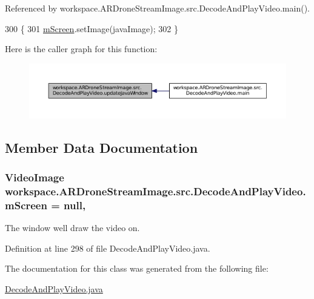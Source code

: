 Referenced by workspace.\+A\+R\+Drone\+Stream\+Image.\+src.\+Decode\+And\+Play\+Video.\+main().


\begin{DoxyCode}
300                                                                   \{
301         \hyperlink{classworkspace_1_1_a_r_drone_stream_image_1_1src_1_1_decode_and_play_video_a6ba754690ce0697ca5b6873615f96f02}{mScreen}.setImage(javaImage);
302     \}
\end{DoxyCode}


Here is the caller graph for this function\+:\nopagebreak
\begin{figure}[H]
\begin{center}
\leavevmode
\includegraphics[width=350pt]{classworkspace_1_1_a_r_drone_stream_image_1_1src_1_1_decode_and_play_video_a6db6d52da537beedda90a3fa39ce85af_icgraph}
\end{center}
\end{figure}




\subsection{Member Data Documentation}
\hypertarget{classworkspace_1_1_a_r_drone_stream_image_1_1src_1_1_decode_and_play_video_a6ba754690ce0697ca5b6873615f96f02}{}
\subsubsection[{m\+Screen}]{\setlength{\rightskip}{0pt plus 5cm}Video\+Image workspace.\+A\+R\+Drone\+Stream\+Image.\+src.\+Decode\+And\+Play\+Video.\+m\+Screen = null\hspace{0.3cm}{\ttfamily [static]}, {\ttfamily [private]}}\label{classworkspace_1_1_a_r_drone_stream_image_1_1src_1_1_decode_and_play_video_a6ba754690ce0697ca5b6873615f96f02}
The window we\textquotesingle{}ll draw the video on. 

Definition at line 298 of file Decode\+And\+Play\+Video.\+java.



The documentation for this class was generated from the following file\+:\begin{DoxyCompactItemize}
\item 
\hyperlink{_decode_and_play_video_8java}{Decode\+And\+Play\+Video.\+java}\end{DoxyCompactItemize}
